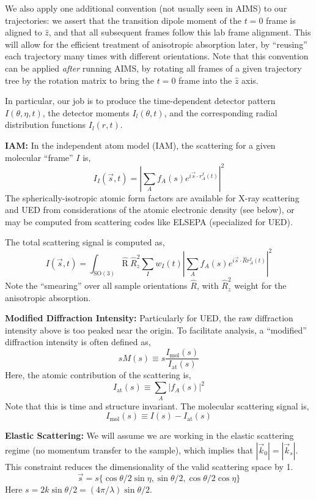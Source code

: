 \documentclass[fleqn,oneside,12pt]{article}
\begin{document}
We also apply one additional convention (not usually seen in AIMS) to our
trajectories: we assert that the transition dipole moment of the $t=0$ frame is
aligned to $\hat z$, and that all subsequent frames follow this lab frame
alignment. This will allow for the efficient treatment of anisotropic absorption
later, by ``reusing'' each trajectory many times with different orientations.
Note that this convention can be applied \emph{after} running AIMS, by rotating
all frames of a given trajectory tree by the rotation matrix to bring the $t=0$
frame into the $\hat z$ axis.

In particular, our job is to produce the time-dependent detector pattern $I
(\theta, \eta, t)$, the detector moments $I_{l} (\theta, t)$, and the
corresponding radial distribution functions $I_{l} (r, t)$.

\textbf{IAM:} In the independent atom model (IAM), the scattering for a given
molecular ``frame'' $I$ is,
\[
I_{I} (\vec s, t)
=   
\left |
\sum_{A}
f_{A} (s)
e^{i \vec s \cdot r_{A}^{I} (t)}
\right |^2
\]
The spherically-isotropic atomic form factors are available for X-ray scattering
and UED from considerations of the atomic electronic density (see below), or may
be computed from scattering codes like ELSEPA (specialized for UED).

The total scattering signal is computed as,
\[
I (\vec s, t)
=
\int_{\mathrm{SO(3)}}
\mathrm{\hat R} \
\hat R_{z}^2
\sum_{I}
w_{I} (t)
\left |
\sum_{A}
f_{A} (s)
e^{i \vec s \cdot \hat R r_{A}^{I} (t)}
\right |^2
\]
Note the ``smearing'' over all sample orientations $\hat R$, with $\hat R_z^2$
weight for the anisotropic absorption.

\textbf{Modified Diffraction Intensity:} Particularly for UED, the raw
diffraction intensity above is too peaked near the origin. To facilitate
analysis, a ``modified'' diffraction intensity is often defined as,
\[
s M(s)
\equiv
s
\frac{I_{\mathrm{mol}} (s)}{I_{\mathrm{at}} (s)}
\]
Here, the atomic contribution of the scattering is,
\[
I_{\mathrm{at}} (s)
\equiv
\sum_{A} | f_{A} (s) |^2
\]
Note that this is time and structure invariant. The molecular scattering signal
is,
\[
I_{\mathrm{mol}} (s)
\equiv
I (s)
-
I_{\mathrm{at}} (s)
\]

\textbf{Elastic Scattering:} We will assume we are working in the elastic
scattering regime (no momentum transfer to the sample), which implies that
$|\vec k_0| = |\vec k_s|$. This constraint reduces the dimensionality of the
valid scattering space by 1.
\[
\vec s = 
s 
\{
\cos \theta / 2 \sin \eta,
\sin \theta / 2,
\cos \theta / 2 \cos \eta
\}
\]
Here $s = 2 k \sin \theta / 2 = (4 \pi / \lambda) \sin \theta / 2$.
\end{document}
